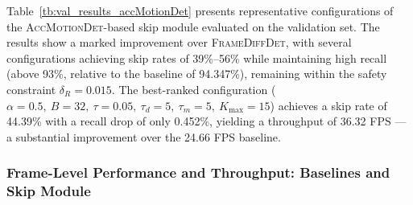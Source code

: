 \documentclass[final,3p,times,twocolumn]{elsarticle}
\begin{document}
Table~\ref{tb:val_results_accMotionDet} presents representative
configurations of the \textsc{AccMotionDet}-based skip module evaluated
on the validation set. The results show a marked improvement over
\textsc{FrameDiffDet}, with several configurations achieving skip rates
of 39\%--56\% while maintaining high recall (above 93\%, relative to the
baseline of 94.347\%), remaining within the safety constraint
$\delta_R = 0.015$. The best-ranked configuration
($\alpha{=}0.5,\ B{=}32,\ \tau{=}0.05,\ \tau_d{=}5,\ \tau_m{=}5,\
K_{\max}{=}15$) achieves a skip rate of 44.39\% with a recall drop of
only 0.452\%, yielding a throughput of 36.32 FPS --- a substantial
improvement over the 24.66 FPS baseline.

\subsubsection{Frame-Level Performance and Throughput: Baselines and Skip
Module}\label{sec:e2e-perf}

\begin{table}[t]
\caption{Frame-level performance and throughput of the proposed
pipeline against lightweight fire-and-smoke detectors on the test set.
``Big Model with Skip Module'' refers to the full proposed pipeline.
Recall, FAR, Accuracy, and Precision are reported in percentage (\%);
FPS is averaged across all frames in the test videos. GFLOPs denotes
the static per-frame floating-point operations ($10^9$) of the
detection model. The best and second-best values per metric are
highlighted in \textbf{bold} and \underline{\textit{italic underline}},
respectively.}
\label{tb:perf_per_frame}
\end{table}
\end{document}
